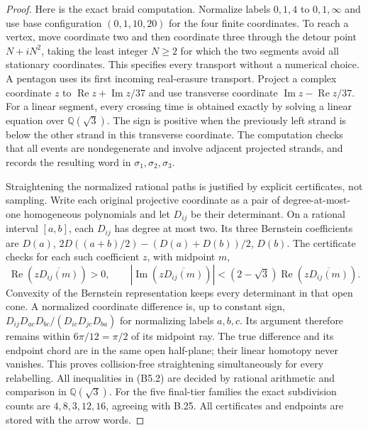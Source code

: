 \begin{proof}
Here is the exact braid computation.  Normalize labels $0,1,4$ to
$0,1,\infty$ and use base configuration $(0,1,10,20)$ for the four
finite coordinates.  To reach a vertex, move coordinate two and then
coordinate three through the detour point $N+iN^2$, taking the least
integer $N\geq2$ for which the two segments avoid all stationary
coordinates.  This specifies every transport without a numerical
choice.  A pentagon uses its first incoming real-erasure transport.
Project a complex coordinate $z$ to
$\operatorname{Re}z+\operatorname{Im}z/37$ and use transverse
coordinate $\operatorname{Im}z-\operatorname{Re}z/37$.
For a linear segment, every crossing time is obtained exactly by
solving a linear equation over $\mathbb Q(\sqrt3)$.
The sign is positive when the previously left strand is below the
other strand in this transverse coordinate.  The computation checks
that all events are nondegenerate and involve adjacent projected
strands, and records the resulting word in $\sigma_1,\sigma_2,\sigma_3$.

Straightening the normalized rational paths is justified by explicit
certificates, not sampling.  Write each original projective coordinate
as a pair of degree-at-most-one homogeneous polynomials and let
$D_{ij}$ be their determinant.  On a rational interval $[a,b]$, each
$D_{ij}$ has degree at most two.  Its three Bernstein coefficients are
$D(a)$, $2D((a+b)/2)-(D(a)+D(b))/2$, $D(b)$.
The certificate checks for each such coefficient $z$, with midpoint $m$,
\[
 \operatorname{Re}(z\overline{D_{ij}(m)})>0,
 \qquad
 |\operatorname{Im}(z\overline{D_{ij}(m)})|
       <(2-\sqrt3)\operatorname{Re}(z\overline{D_{ij}(m)}).
                                                               \tag{B5.2}
\]
Convexity of the Bernstein representation keeps every determinant in
that open cone.  A normalized coordinate difference is, up to constant
sign,
$D_{ij}D_{ac}D_{bc}/(D_{ic}D_{jc}D_{ba})$ for normalizing labels
$a,b,c$.  Its argument therefore remains within $6\pi/12=\pi/2$
of its midpoint ray.  The true difference and its endpoint chord are
in the same open half-plane; their linear homotopy never vanishes.
This proves collision-free straightening simultaneously for every
relabelling.  All inequalities in (B5.2) are decided by rational
arithmetic and comparison in $\mathbb Q(\sqrt3)$.
For the five final-tier families the exact subdivision counts are
$4,8,3,12,16$, agreeing with B.25.  All certificates and endpoints are
stored with the arrow words.


\end{proof}

